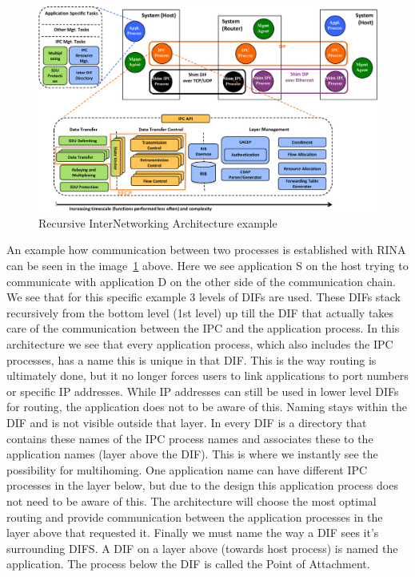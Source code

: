 \npar
\begin{figure}[H]
    \centering
    \includegraphics[width=\textwidth]{figures/referencemodel}
    \caption{Recursive InterNetworking Architecture example \citep{vrijders2014prototyping}} 
    \label{fig:RINAexample}
\end{figure}
\npar
An example how communication between two processes is established with RINA can be seen in the image~\ref{fig:RINAexample} above. Here we see application S on the host trying to communicate with application D on the other side of the communication chain. We see that for this specific example 3 levels of DIFs are used. These DIFs stack recursively from the bottom level (1st level) up till the DIF that actually takes care of the communication between the IPC and the application process. 
\npar
In this architecture we see that every application process, which also includes the IPC processes, has a name this is unique in that DIF. This is the way routing is ultimately done, but it no longer forces users to link applications to port numbers or specific IP addresses. While IP addresses can still be used in lower level DIFs for routing, the application does not to be aware of this. Naming stays within the DIF and is not visible outside that layer. In every DIF is a directory that contains these names of the IPC process names  and associates these to the application names (layer above the DIF). This is where we instantly see the possibility for multihoming. One application name can have different IPC processes in the layer below, but due to the design this application process does not need to be aware of this. The architecture will choose the most optimal routing and provide communication between the application processes in the layer above that requested it. Finally we must name the way a DIF sees it's surrounding DIFS. A DIF on a layer above (towards host process) is named the application. The process below the DIF is called the Point of Attachment. 


